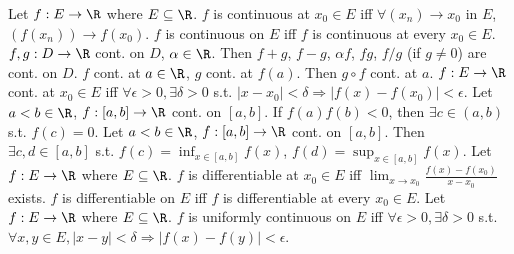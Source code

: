  Let $f: E \to \R$ where $E \subseteq \R$.
$f$ is continuous at $x_0 \in E$ iff $\forall (x_n) \to x_0$ in $E$,
$(f(x_n)) \to f(x_0)$.
$f$ is continuous on $E$ iff $f$ is continuous at every $x_0 \in E$.
 $f,g: D \to \R$ cont. on $D$, $\alpha \in \R$.
Then $f+g$, $f-g$, $\alpha f$, $fg$, $f/g$ (if $g \neq 0$) are cont. on $D$.
 $f$ cont. at $a \in \R$, $g$ cont. at $f(a)$.
Then $g \circ f$ cont. at $a$.
$f: E \to \R$ cont. at $x_0 \in E$ iff $\forall \epsilon > 0, \exists \delta > 0$ s.t.
$|x - x_0| < \delta \Rightarrow |f(x) - f(x_0)| < \epsilon$.
 Let $a<b \in \R$, $f: [a,b] \to \R$ cont. on $[a,b]$.
If $f(a)f(b) < 0$, then $\exists c \in (a,b)$ s.t. $f(c) = 0$.
 Let $a<b \in \R$, $f: [a,b] \to \R$ cont. on $[a,b]$.
Then $\exists c,d \in [a,b]$ s.t.
$f(c) = \inf_{x \in [a,b]} f(x)$, $f(d) = \sup_{x \in [a,b]} f(x)$.
 Let $f: E \to \R$ where $E \subseteq \R$.
$f$ is differentiable at $x_0 \in E$ iff
$\lim_{x \to x_0} \frac{f(x) - f(x_0)}{x - x_0}$ exists.
$f$ is differentiable on $E$ iff $f$ is differentiable at every $x_0 \in E$.
 Let $f: E \to \R$ where $E \subseteq \R$.
$f$ is uniformly continuous on $E$ iff
$\forall \epsilon > 0, \exists \delta > 0$ s.t.
$\forall x,y \in E, |x - y| < \delta \Rightarrow |f(x) - f(y)| < \epsilon$.
